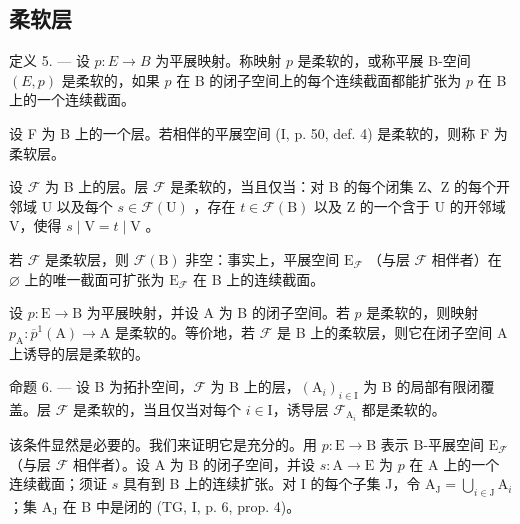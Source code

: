 \subsection{柔软层}

定义 5. --- 设 \(p\colon E \rightarrow B\) 为平展映射。称映射 \(p\) 是柔软的，或称平展 B-空间 \((E,p)\) 是柔软的，如果 \(p\) 在 B 的闭子空间上的每个连续截面都能扩张为 \(p\) 在 B 上的一个连续截面。

设 F 为 B 上的一个层。若相伴的平展空间 (I, p. 50, def. 4) 是柔软的，则称 F 为柔软层。

设 \(\mathcal{F}\) 为 B 上的层。层 \(\mathcal{F}\) 是柔软的，当且仅当：对 B 的每个闭集 Z、Z 的每个开邻域 U 以及每个 \(s \in \mathcal{F}(\mathrm{U})\) ，存在 \(t \in \mathcal{F}(\mathrm{B})\) 以及 Z 的一个含于 U 的开邻域 V，使得 \(s \mid \mathrm{V} = t \mid \mathrm{V}\) 。

若 \(\mathcal{F}\) 是柔软层，则 \(\mathcal{F}(\mathrm{B})\) 非空：事实上，平展空间 \(\mathrm{E}_{\mathcal{F}}\) （与层 \(\mathcal{F}\) 相伴者）在 \(\varnothing\) 上的唯一截面可扩张为 \(\mathrm{E}_{\mathcal{F}}\) 在 B 上的连续截面。

设 \(p \colon \mathrm{E} \to \mathrm{B}\) 为平展映射，并设 A 为 B 的闭子空间。若 \(p\) 是柔软的，则映射 \(p_{\mathrm{A}} \colon \overline{p}^{1}(\mathrm{A}) \to \mathrm{A}\) 是柔软的。等价地，若 \(\mathcal{F}\) 是 B 上的柔软层，则它在闭子空间 A 上诱导的层是柔软的。

命题 6. --- 设 B 为拓扑空间，\(\mathcal{F}\) 为 B 上的层，\((\mathrm{A}_i)_{i\in \mathrm{I}}\) 为 B 的局部有限闭覆盖。层 \(\mathcal{F}\) 是柔软的，当且仅当对每个 \(i\in \mathrm{I}\)，诱导层 \(\mathcal{F}_{\mathrm{A}_i}\) 都是柔软的。

该条件显然是必要的。我们来证明它是充分的。用 \(p\colon \mathrm{E}\to \mathrm{B}\) 表示 B-平展空间 \(\mathrm{E}_{\mathcal{F}}\) （与层 \(\mathcal{F}\) 相伴者）。设 A 为 B 的闭子空间，并设 \(s\colon \mathrm{A}\to \mathrm{E}\) 为 \(p\) 在 A 上的一个连续截面；须证 \(s\) 具有到 B 上的连续扩张。对 I 的每个子集 J，令 \(\mathrm{A_J} = \bigcup_{i\in \mathrm{J}}\mathrm{A}_i\) ；集 \(\mathrm{A_J}\) 在 B 中是闭的 (TG, I, p. 6, prop. 4)。

